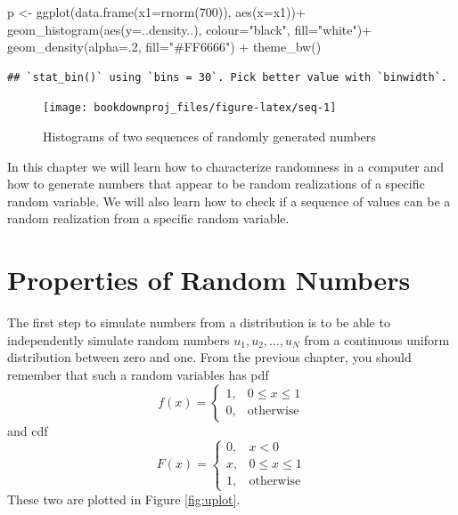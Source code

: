\documentclass[
]{book}
\newenvironment{Shaded}{\begin{snugshade}}{\end{snugshade}}
\newcommand{\AttributeTok}[1]{\textcolor[rgb]{0.77,0.63,0.00}{#1}}
\newcommand{\DecValTok}[1]{\textcolor[rgb]{0.00,0.00,0.81}{#1}}
\newcommand{\FunctionTok}[1]{\textcolor[rgb]{0.00,0.00,0.00}{#1}}
\newcommand{\NormalTok}[1]{#1}
\newcommand{\OtherTok}[1]{\textcolor[rgb]{0.56,0.35,0.01}{#1}}
\newcommand{\SpecialCharTok}[1]{\textcolor[rgb]{0.00,0.00,0.00}{#1}}
\newcommand{\StringTok}[1]{\textcolor[rgb]{0.31,0.60,0.02}{#1}}
\theoremstyle{definition}
\theoremstyle{definition}
\theoremstyle{definition}
\theoremstyle{definition}
\theoremstyle{remark}
\begin{document}
\begin{Shaded}
\begin{Highlighting}[]
\NormalTok{p }\OtherTok{\textless{}{-}} \FunctionTok{ggplot}\NormalTok{(}\FunctionTok{data.frame}\NormalTok{(}\AttributeTok{x1=}\FunctionTok{rnorm}\NormalTok{(}\DecValTok{700}\NormalTok{)), }\FunctionTok{aes}\NormalTok{(}\AttributeTok{x=}\NormalTok{x1))}\SpecialCharTok{+}
   \FunctionTok{geom\_histogram}\NormalTok{(}\FunctionTok{aes}\NormalTok{(}\AttributeTok{y=}\NormalTok{..density..), }\AttributeTok{colour=}\StringTok{"black"}\NormalTok{, }\AttributeTok{fill=}\StringTok{"white"}\NormalTok{)}\SpecialCharTok{+}
 \FunctionTok{geom\_density}\NormalTok{(}\AttributeTok{alpha=}\NormalTok{.}\DecValTok{2}\NormalTok{, }\AttributeTok{fill=}\StringTok{"\#FF6666"}\NormalTok{)  }\SpecialCharTok{+} \FunctionTok{theme\_bw}\NormalTok{() }
\end{Highlighting}
\end{Shaded}

\begin{verbatim}
## `stat_bin()` using `bins = 30`. Pick better value with `binwidth`.
\end{verbatim}

\begin{figure}

{\centering \texttt{[image: bookdownproj\_files/figure-latex/seq-1]} 

}

\caption{Histograms of two sequences of randomly generated numbers}\label{fig:seq}
\end{figure}

In this chapter we will learn how to characterize randomness in a computer and how to generate numbers that appear to be random realizations of a specific random variable. We will also learn how to check if a sequence of values can be a random realization from a specific random variable.

\hypertarget{properties-of-random-numbers}{%
\section{Properties of Random Numbers}\label{properties-of-random-numbers}}

The first step to simulate numbers from a distribution is to be able to independently simulate random numbers \(u_1,u_2,\dots,u_N\) from a continuous uniform distribution between zero and one. From the previous chapter, you should remember that such a random variables has pdf
\[
f(x)=\left\{
\begin{array}{ll}
1, & 0\leq x \leq 1\\
0, &\mbox{otherwise}
\end{array}
\right.
\]
and cdf
\[
F(x)=\left\{
\begin{array}{ll}
0, & x<0\\
x, & 0\leq x \leq 1\\
1, &\mbox{otherwise}
\end{array}
\right.
\]
These two are plotted in Figure \ref{fig:uplot}.
\end{document}
